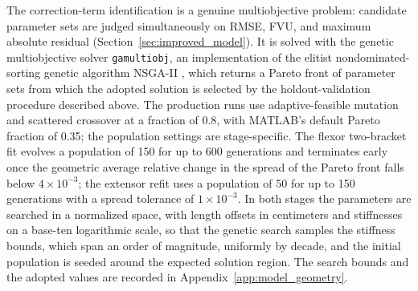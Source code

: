 The correction-term identification is a genuine multiobjective problem: candidate parameter sets are judged simultaneously on RMSE, FVU, and maximum absolute residual (Section~\ref{sec:improved_model}). It is solved with the genetic multiobjective solver \texttt{gamultiobj}, an implementation of the elitist nondominated-sorting genetic algorithm NSGA-II \citep{deb_nsga2_2002, mathworks_optimization_2025}, which returns a Pareto front of parameter sets from which the adopted solution is selected by the holdout-validation procedure described above. The production runs use adaptive-feasible mutation and scattered crossover at a fraction of 0.8, with MATLAB's default Pareto fraction of 0.35; the population settings are stage-specific. The flexor two-bracket fit evolves a population of 150 for up to 600 generations and terminates early once the geometric average relative change in the spread of the Pareto front falls below $4\times10^{-3}$; the extensor refit uses a population of 50 for up to 150 generations with a spread tolerance of $1\times10^{-3}$. In both stages the parameters are searched in a normalized space, with length offsets in centimeters and stiffnesses on a base-ten logarithmic scale, so that the genetic search samples the stiffness bounds, which span an order of magnitude, uniformly by decade, and the initial population is seeded around the expected solution region. The search bounds and the adopted values are recorded in Appendix~\ref{app:model_geometry}.

